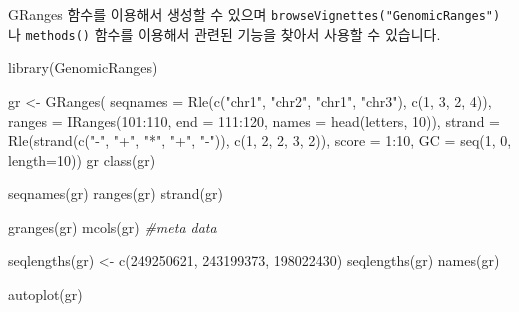 \documentclass[
]{book}
\newenvironment{Shaded}{\begin{snugshade}}{\end{snugshade}}
\newcommand{\AttributeTok}[1]{\textcolor[rgb]{0.77,0.63,0.00}{#1}}
\newcommand{\CommentTok}[1]{\textcolor[rgb]{0.56,0.35,0.01}{\textit{#1}}}
\newcommand{\DecValTok}[1]{\textcolor[rgb]{0.00,0.00,0.81}{#1}}
\newcommand{\FunctionTok}[1]{\textcolor[rgb]{0.00,0.00,0.00}{#1}}
\newcommand{\NormalTok}[1]{#1}
\newcommand{\OtherTok}[1]{\textcolor[rgb]{0.56,0.35,0.01}{#1}}
\newcommand{\SpecialCharTok}[1]{\textcolor[rgb]{0.00,0.00,0.00}{#1}}
\newcommand{\StringTok}[1]{\textcolor[rgb]{0.31,0.60,0.02}{#1}}
\begin{document}
GRanges 함수를 이용해서 생성할 수 있으며 \texttt{browseVignettes("GenomicRanges")} 나 \texttt{methods()} 함수를 이용해서 관련된 기능을 찾아서 사용할 수 있습니다.

\begin{Shaded}
\begin{Highlighting}[]
\FunctionTok{library}\NormalTok{(GenomicRanges)}

\NormalTok{gr }\OtherTok{\textless{}{-}} \FunctionTok{GRanges}\NormalTok{(}
    \AttributeTok{seqnames =} \FunctionTok{Rle}\NormalTok{(}\FunctionTok{c}\NormalTok{(}\StringTok{"chr1"}\NormalTok{, }\StringTok{"chr2"}\NormalTok{, }\StringTok{"chr1"}\NormalTok{, }\StringTok{"chr3"}\NormalTok{), }\FunctionTok{c}\NormalTok{(}\DecValTok{1}\NormalTok{, }\DecValTok{3}\NormalTok{, }\DecValTok{2}\NormalTok{, }\DecValTok{4}\NormalTok{)),}
    \AttributeTok{ranges =} \FunctionTok{IRanges}\NormalTok{(}\DecValTok{101}\SpecialCharTok{:}\DecValTok{110}\NormalTok{, }\AttributeTok{end =} \DecValTok{111}\SpecialCharTok{:}\DecValTok{120}\NormalTok{, }\AttributeTok{names =} \FunctionTok{head}\NormalTok{(letters, }\DecValTok{10}\NormalTok{)),}
    \AttributeTok{strand =} \FunctionTok{Rle}\NormalTok{(}\FunctionTok{strand}\NormalTok{(}\FunctionTok{c}\NormalTok{(}\StringTok{"{-}"}\NormalTok{, }\StringTok{"+"}\NormalTok{, }\StringTok{"*"}\NormalTok{, }\StringTok{"+"}\NormalTok{, }\StringTok{"{-}"}\NormalTok{)), }\FunctionTok{c}\NormalTok{(}\DecValTok{1}\NormalTok{, }\DecValTok{2}\NormalTok{, }\DecValTok{2}\NormalTok{, }\DecValTok{3}\NormalTok{, }\DecValTok{2}\NormalTok{)),}
    \AttributeTok{score =} \DecValTok{1}\SpecialCharTok{:}\DecValTok{10}\NormalTok{,}
    \AttributeTok{GC =} \FunctionTok{seq}\NormalTok{(}\DecValTok{1}\NormalTok{, }\DecValTok{0}\NormalTok{, }\AttributeTok{length=}\DecValTok{10}\NormalTok{))}
\NormalTok{gr}
\FunctionTok{class}\NormalTok{(gr)}

\FunctionTok{seqnames}\NormalTok{(gr)}
\FunctionTok{ranges}\NormalTok{(gr)}
\FunctionTok{strand}\NormalTok{(gr)}

\FunctionTok{granges}\NormalTok{(gr) }
\FunctionTok{mcols}\NormalTok{(gr) }\CommentTok{\#meta data}

\FunctionTok{seqlengths}\NormalTok{(gr) }\OtherTok{\textless{}{-}} \FunctionTok{c}\NormalTok{(}\DecValTok{249250621}\NormalTok{, }\DecValTok{243199373}\NormalTok{, }\DecValTok{198022430}\NormalTok{)}
\FunctionTok{seqlengths}\NormalTok{(gr)}
\FunctionTok{names}\NormalTok{(gr)}

\FunctionTok{autoplot}\NormalTok{(gr)}
\end{Highlighting}
\end{Shaded}
\end{document}

